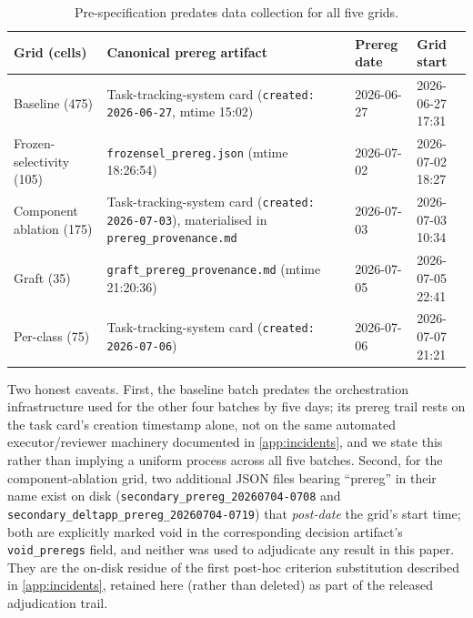 \begin{table}[htbp]
\centering
\small
\caption{Pre-specification predates data collection for all five grids.}
\label{tab:appendixA-prereg}
\begin{tabular}{@{}p{2.6cm}p{5.0cm}p{2.0cm}p{2.0cm}@{}}
\toprule
Grid (cells) & Canonical prereg artifact & Prereg date & Grid start \\
\midrule
Baseline (475) & Task-tracking-system card (\texttt{created: 2026-06-27}, mtime 15:02) & 2026-06-27 & 2026-06-27 17:31 \\
Frozen-selectivity (105) & \texttt{frozensel\_prereg.json} (mtime 18:26:54) & 2026-07-02 & 2026-07-02 18:27 \\
Component ablation (175) & Task-tracking-system card (\texttt{created: 2026-07-03}), materialised in \texttt{prereg\_provenance.md} & 2026-07-03 & 2026-07-03 10:34 \\
Graft (35) & \texttt{graft\_prereg\_provenance.md} (mtime 21:20:36) & 2026-07-05 & 2026-07-05 22:41 \\
Per-class (75) & Task-tracking-system card (\texttt{created: 2026-07-06}) & 2026-07-06 & 2026-07-07 21:21 \\
\bottomrule
\end{tabular}
\end{table}

Two honest caveats. First, the baseline batch predates the orchestration infrastructure used for the other four batches by five days; its prereg trail rests on the task card's creation timestamp alone, not on the same automated executor/reviewer machinery documented in \ref{app:incidents}, and we state this rather than implying a uniform process across all five batches. Second, for the component-ablation grid, two additional JSON files bearing ``prereg'' in their name exist on disk (\texttt{secondary\_prereg\_20260704-0708} and \texttt{secondary\_deltapp\_prereg\_20260704-0719}) that \emph{post-date} the grid's start time; both are explicitly marked void in the corresponding decision artifact's \texttt{void\_preregs} field, and neither was used to adjudicate any result in this paper. They are the on-disk residue of the first post-hoc criterion substitution described in \ref{app:incidents}, retained here (rather than deleted) as part of the released adjudication trail.
